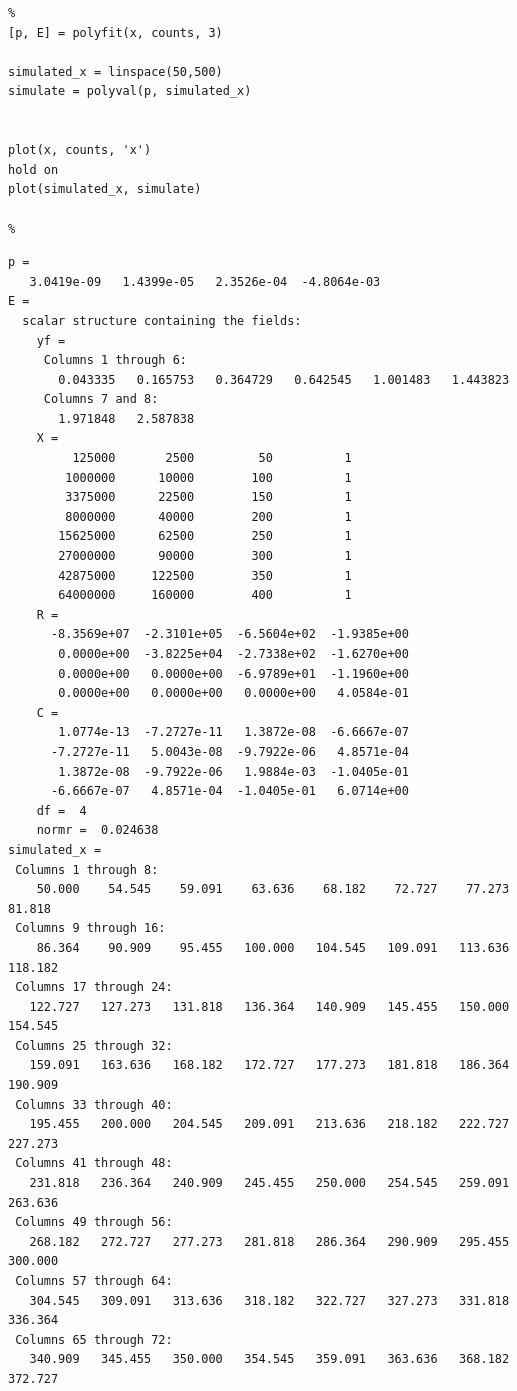 \documentclass[10pt]{article}
\begin{document}
\begin{lstlisting}
%
[p, E] = polyfit(x, counts, 3)

simulated_x = linspace(50,500)
simulate = polyval(p, simulated_x)


plot(x, counts, 'x')
hold on
plot(simulated_x, simulate)

%
\end{lstlisting}
\begin{lstlisting}[language={},xleftmargin=5pt,frame=none]
p =
   3.0419e-09   1.4399e-05   2.3526e-04  -4.8064e-03
E =
  scalar structure containing the fields:
    yf =
     Columns 1 through 6:
       0.043335   0.165753   0.364729   0.642545   1.001483   1.443823
     Columns 7 and 8:
       1.971848   2.587838
    X =
         125000       2500         50          1
        1000000      10000        100          1
        3375000      22500        150          1
        8000000      40000        200          1
       15625000      62500        250          1
       27000000      90000        300          1
       42875000     122500        350          1
       64000000     160000        400          1
    R =
      -8.3569e+07  -2.3101e+05  -6.5604e+02  -1.9385e+00
       0.0000e+00  -3.8225e+04  -2.7338e+02  -1.6270e+00
       0.0000e+00   0.0000e+00  -6.9789e+01  -1.1960e+00
       0.0000e+00   0.0000e+00   0.0000e+00   4.0584e-01
    C =
       1.0774e-13  -7.2727e-11   1.3872e-08  -6.6667e-07
      -7.2727e-11   5.0043e-08  -9.7922e-06   4.8571e-04
       1.3872e-08  -9.7922e-06   1.9884e-03  -1.0405e-01
      -6.6667e-07   4.8571e-04  -1.0405e-01   6.0714e+00
    df =  4
    normr =  0.024638
simulated_x =
 Columns 1 through 8:
    50.000    54.545    59.091    63.636    68.182    72.727    77.273    81.818
 Columns 9 through 16:
    86.364    90.909    95.455   100.000   104.545   109.091   113.636   118.182
 Columns 17 through 24:
   122.727   127.273   131.818   136.364   140.909   145.455   150.000   154.545
 Columns 25 through 32:
   159.091   163.636   168.182   172.727   177.273   181.818   186.364   190.909
 Columns 33 through 40:
   195.455   200.000   204.545   209.091   213.636   218.182   222.727   227.273
 Columns 41 through 48:
   231.818   236.364   240.909   245.455   250.000   254.545   259.091   263.636
 Columns 49 through 56:
   268.182   272.727   277.273   281.818   286.364   290.909   295.455   300.000
 Columns 57 through 64:
   304.545   309.091   313.636   318.182   322.727   327.273   331.818   336.364
 Columns 65 through 72:
   340.909   345.455   350.000   354.545   359.091   363.636   368.182   372.727

\end{lstlisting}
\end{document}
